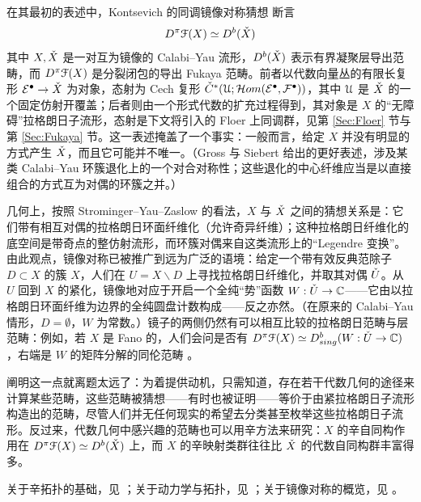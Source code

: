 在其最初的表述中，Kontsevich 的同调镜像对称猜想 \cite{Kontsevich} 断言
\begin{equation} \label{Eqn:HMS}
D^{\pi}\EuScript{F}(X) \simeq D^b(\check{X})
\end{equation}
其中 $X, \check{X}$ 是一对互为镜像的 Calabi--Yau 流形，$D^b(\check{X})$ 表示有界凝聚层导出范畴，而 $D^{\pi}\EuScript{F}(X)$ 是分裂闭包的导出 Fukaya 范畴。前者以代数向量丛的有限长复形 $\mathcal{E}^{\bullet} \rightarrow \check{X}$ 为对象，态射为 Cech 复形 $\check{C}^*(\EuScript{U}; \mathcal{H}om(\mathcal{E}^{\bullet}, \mathcal{F}^{\bullet}))$，其中 $\EuScript{U}$ 是 $\check{X}$ 的一个固定仿射开覆盖；后者则由一个形式代数的扩充过程得到，其对象是 $X$ 的“无障碍”拉格朗日子流形，态射是下文将引入的 Floer 上同调群，见第 \ref{Sec:Floer} 节与第 \ref{Sec:Fukaya} 节。这一表述掩盖了一个事实：一般而言，给定 $X$ 并没有明显的方式产生 $\check{X}$，而且它可能并不唯一。（Gross 与 Siebert \cite{GrossSiebert} 给出的更好表述，涉及某类 Calabi--Yau 环簇退化上的一个对合对称性；这些退化的中心纤维应当是以直接组合的方式互为对偶的环簇之并。）



几何上，按照 Strominger--Yau--Zaslow \cite{SYZ} 的看法，$X$ 与 $\check{X}$ 之间的猜想关系是：它们带有相互对偶的拉格朗日环面纤维化（允许奇异纤维）；这种拉格朗日纤维化的底空间是带奇点的整仿射流形，而环簇对偶来自这类流形上的“Legendre 变换”。由此观点，镜像对称已被推广到远为广泛的语境：给定一个带有效反典范除子 $D\subset X$ 的簇 $X$，人们在 $U=X\backslash D$ 上寻找拉格朗日纤维化，并取其对偶 $\check{U}$。从 $U$ 回到 $X$ 的紧化，镜像地对应于开启一个全纯“势”函数 $W: \check{U}\rightarrow \mathbb{C}$——它由以拉格朗日环面纤维为边界的全纯圆盘计数构成——反之亦然。（在原来的 Calabi--Yau 情形，$D = \emptyset$，$W$ 为常数。）镜子的两侧仍然有可以相互比较的拉格朗日范畴与层范畴：例如，若 $X$ 是 Fano 的，人们会问是否有 $D^{\pi}\EuScript{F}(X) \simeq D^b_{sing}(W:\check{U} \rightarrow \mathbb{C})$，右端是 $W$ 的矩阵分解的同伦范畴 \cite{Orlov:Dbsing}。

阐明这一点就离题太远了：为着提供动机，只需知道，存在若干代数几何的途径来计算某些范畴，这些范畴被猜想——有时也被证明——等价于由紧拉格朗日子流形构造出的范畴，尽管人们并无任何现实的希望去分类甚至枚举这些拉格朗日子流形。反过来，代数几何中感兴趣的范畴也可以用辛方法来研究：$X$ 的辛自同构作用在 $D^{\pi}\EuScript{F}(X)\simeq D^b(\check{X})$ 上，而 $X$ 的辛映射类群往往比 $\check{X}$ 的代数自同构群丰富得多。

\begin{Notes} 关于辛拓扑的基础，见 \cite{ACdaS, McD-S}；关于动力学与拓扑，见 \cite{HZ, EOSS}；关于镜像对称的概览，见 \cite{AspinwallEtAl, Ballard, Gross:tropical}。\end{Notes}
